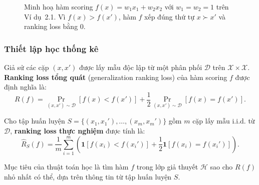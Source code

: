 \begin{figure}[H]
\centering
{}
\caption{Minh hoạ hàm scoring $f(x) = w_1x_1 + w_2x_2$ với $w_1=w_2=1$
trên Ví dụ~2.1. Vì $f(x) > f(x')$, hàm $f$ xếp đúng thứ tự 
$x \succ x'$ và ranking loss bằng $0$.}
\label{fig:scoring}
\end{figure}

\subsubsection{Thiết lập học thống kê}

Giả sử các cặp $(x, x')$ được lấy mẫu độc lập từ một phân 
phối $\mathcal{D}$ trên $\mathcal{X} \times \mathcal{X}$. 
\textbf{Ranking loss tổng quát} (generalization ranking loss) 
của hàm scoring $f$ được định nghĩa là:
\[
  R(f) = \Pr_{(x,x') \sim \mathcal{D}}[f(x) < f(x')] 
       + \frac{1}{2}\Pr_{(x,x') \sim \mathcal{D}}[f(x) = f(x')].
\]

Cho tập huấn luyện $S = \{(x_1, x_1'), \ldots, (x_m, x_m')\}$ 
gồm $m$ cặp lấy mẫu i.i.d. từ $\mathcal{D}$, 
\textbf{ranking loss thực nghiệm} được tính là:
\[
  \hat{R}_S(f) = \frac{1}{m} \sum_{i=1}^{m} 
  \left( \mathbf{1}[f(x_i) < f(x_i')] 
  + \frac{1}{2}\mathbf{1}[f(x_i) = f(x_i')] \right).
\]

Mục tiêu của thuật toán học là tìm hàm $f$ trong lớp giả thuyết 
$\mathcal{H}$ sao cho $R(f)$ nhỏ nhất có thể, dựa trên thông tin 
từ tập huấn luyện $S$.

